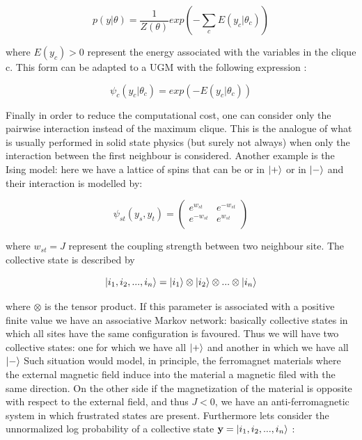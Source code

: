 \documentclass[12pt,%
               a4paper,%
               oneside,openany,%
               titlepage,%
               headinclude,footinclude,%
               BCOR5mm,%
               cleardoublepage=empty,%
               tablecaptionabove,%
               floatperchapter,
               ]{scrreprt}                 %
\begin{document}
\begin{equation}
p(y|\theta)=\dfrac{1}{Z(\theta)} exp\left(-\sum_{c}E(y_{c}|\theta_{c})\right)
\end{equation}

where $E(y_{c})>0$ represent the energy associated with the variables in the clique c.  This form can be adapted to a UGM with the following expression \cite{murphy2012machine}:

\begin{equation}
\psi_{c}(y_{c}|\theta_{c})=exp\left(-E(y_{c}|\theta_{c})\right)
\end{equation}

Finally in order to reduce the computational cost,  one can consider only the pairwise interaction instead of the maximum clique. This is the analogue of what is usually performed in solid state physics (but surely not always)  when only the interaction between the first neighbour is considered.  Another example is the  Ising model: here we have a lattice of spins that can be or in $\ket{+}$ or in $\ket{-}$ and their interaction is modelled by\cite{murphy2012machine}:


\begin{equation}
\psi_{st}\left(y_{s},y_{t}\right) =
\begin{pmatrix}
e^{w_{st}} & e^{-w_{st}} \\
e^{-w_{st}} & e^{w_{st}} \\
\end{pmatrix}
\end{equation}

where $w_{st}=J$ represent the coupling strength between two neighbour site.  The collective state is described by 

\begin{equation}
\ket{i_{1},i_{2},...,i_{n}}=\ket{i_{1}}\otimes\ket{i_{2}}\otimes...\otimes\ket{i_{n}}
\end{equation}

where $\otimes$ is the tensor product.  If this parameter is associated with a positive finite value we have an associative Markov network: basically collective states in which all sites have the same configuration is favoured. Thus we will have two collective states: one for which we have all $\ket{+}$ and another in which we have all $\ket{-}$  Such situation would model,  in principle,  the ferromagnet materials where the external magnetic field induce into the material a magnetic filed with the same direction.  On the other side if the magnetization of the material is opposite with respect to the external field,  and thus $J<0$,  we have an anti-ferromagnetic system in which frustrated states are present.  Furthermore lets consider the unnormalized log probability of a collective state $\textbf{y}=\ket{i_{1},i_{2},...,i_{n}}$ \cite{murphy2012machine}:
\end{document}
